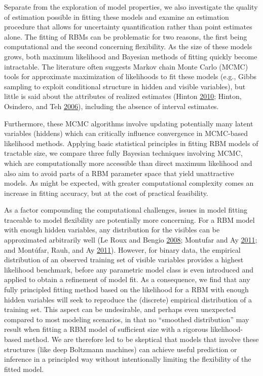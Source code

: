 \documentclass[]{article}
\theoremstyle{definition}
\begin{document}
Separate from the exploration of model properties, we also investigate
the quality of estimation possible in fitting these models and examine
an estimation procedure that allows for uncertainty quantification
rather than point estimates alone. The fitting of RBMs can be
problematic for two reasons, the first being computational and the
second concerning flexibility. As the size of these models grows, both
maximum likelihood and Bayesian methods of fitting quickly become
intractable. The literature often suggests Markov chain Monte Carlo
(MCMC) tools for approximate maximization of likelihoods to fit these
models (e.g., Gibbs sampling to exploit conditional structure in hidden
and visible variables), but little is said about the attributes of
realized estimates (Hinton
\protect\hyperlink{ref-hinton2010practical}{2010}; Hinton, Osindero, and
Teh \protect\hyperlink{ref-hinton2006fast}{2006}), including the absence
of interval estimates.

Furthermore, these MCMC algorithms involve updating potentially many
latent variables (hiddens) which can critically influence convergence in
MCMC-based likelihood methods. Applying basic statistical principles in
fitting RBM models of tractable size, we compare three fully Bayesian
techniques involving MCMC, which are computationally more accessible
than direct maximum likelihood and also aim to avoid parts of a RBM
parameter space that yield unattractive models. As might be expected,
with greater computational complexity comes an increase in fitting
accuracy, but at the cost of practical feasibility.

As a factor compounding the computational challenges, issues in model
fitting traceable to model flexibility are potentially more concerning.
For a RBM model with enough hidden variables, any distribution for the
visibles can be approximated arbitrarily well (Le Roux and Bengio
\protect\hyperlink{ref-le2008representational}{2008}; Montufar and Ay
\protect\hyperlink{ref-montufar2011refinements}{2011}; and Montúfar,
Rauh, and Ay \protect\hyperlink{ref-montufar2011expressive}{2011}).
However, for binary data, the empirical distribution of an observed
training set of visible variables provides a highest likelihood
benchmark, before any parametric model class is even introduced and
applied to obtain a refinement of model fit. As a consequence, we find
that any fully principled fitting method based on the likelihood for a
RBM with enough hidden variables will seek to reproduce the (discrete)
empirical distribution of a training set. This aspect can be
undesirable, and perhaps even unexpected compared to most modeling
scenarios, in that no ``smoothed distribution'' may result when fitting
a RBM model of sufficient size with a rigorous likelihood-based method.
We are therefore led to be skeptical that models that involve these
structures (like deep Boltzmann machines) can achieve useful prediction
or inference in a principled way without intentionally limiting the
flexibility of the fitted model.
\end{document}
